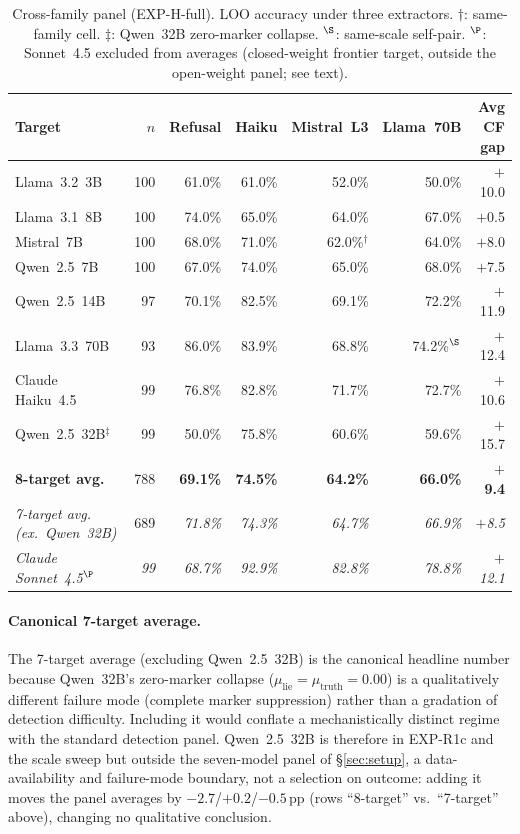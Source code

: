 \begin{table}[h]
\centering
\caption{Cross-family panel (EXP-H-full). LOO accuracy under three extractors. $\dagger$: same-family cell. $\ddagger$: Qwen~32B zero-marker collapse. $^\S$: same-scale self-pair. $^\P$: Sonnet~4.5 excluded from averages (closed-weight frontier target, outside the open-weight panel; see text).}
\label{tab:cross_family_panel}
\begin{small}
\begin{tabular}{lrrrrrr}
\toprule
\textbf{Target} & \textbf{$n$} & \textbf{Refusal} & \textbf{Haiku} & \textbf{Mistral~L3} & \textbf{Llama~70B} & \textbf{Avg CF gap} \\
\midrule
Llama~3.2~3B     & 100 & 61.0\% & 61.0\% & 52.0\% & 50.0\% & $+$10.0 \\
Llama~3.1~8B     & 100 & 74.0\% & 65.0\% & 64.0\% & 67.0\% & $+$0.5 \\
Mistral~7B       & 100 & 68.0\% & 71.0\% & 62.0\%$^\dagger$ & 64.0\% & $+$8.0 \\
Qwen~2.5~7B      & 100 & 67.0\% & 74.0\% & 65.0\% & 68.0\% & $+$7.5 \\
Qwen~2.5~14B     &  97 & 70.1\% & 82.5\% & 69.1\% & 72.2\% & $+$11.9 \\
Llama~3.3~70B    &  93 & 86.0\% & 83.9\% & 68.8\% & 74.2\%$^\S$ & $+$12.4 \\
Claude Haiku~4.5 &  99 & 76.8\% & 82.8\% & 71.7\% & 72.7\% & $+$10.6 \\
Qwen~2.5~32B$^\ddagger$ &  99 & 50.0\% & 75.8\% & 60.6\% & 59.6\% & $+$15.7 \\
\midrule
\textbf{8-target avg.} & 788 & \textbf{69.1\%} & \textbf{74.5\%} & \textbf{64.2\%} & \textbf{66.0\%} & \textbf{$+$9.4} \\
\textit{7-target avg. (ex.\ Qwen~32B)} & 689 & \textit{71.8\%} & \textit{74.3\%} & \textit{64.7\%} & \textit{66.9\%} & \textit{$+$8.5} \\
\midrule
\textit{Claude Sonnet~4.5$^\P$} & \textit{99} & \textit{68.7\%} & \textit{92.9\%} & \textit{82.8\%} & \textit{78.8\%} & \textit{$+$12.1} \\
\bottomrule
\end{tabular}
\end{small}
\end{table}

\paragraph{Canonical 7-target average.} The 7-target average (excluding Qwen~2.5~32B) is the canonical headline number because Qwen~32B's zero-marker collapse ($\mu_\mathrm{lie}\!=\!\mu_\mathrm{truth}\!=\!0.00$) is a qualitatively different failure mode (complete marker suppression) rather than a gradation of detection difficulty. Including it would conflate a mechanistically distinct regime with the standard detection panel. Qwen~2.5~32B is therefore in EXP-R1c and the scale sweep but outside the seven-model panel of §\ref{sec:setup}, a data-availability and failure-mode boundary, not a selection on outcome: adding it moves the panel averages by $-2.7$/$+0.2$/$-0.5$\,pp (rows ``8-target'' vs.\ ``7-target'' above), changing no qualitative conclusion.

